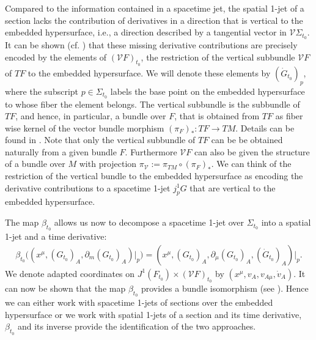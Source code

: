 Compared to the information contained in a spacetime jet, the spatial 1-jet of a section lacks the contribution of derivatives in a direction that is vertical to the embedded hypersurface, i.e., a direction described by a tangential vector in $\mathcal{V}\Sigma_{t_0}$. It can be shown (cf. \cite{1998physics...1019G}) that these missing derivative contributions are precisely encoded by the elements of
$(\mathcal{V}F)_{t_0}$, the restriction of the vertical subbundle $\mathcal{V}F$ of $TF$ to the embedded hypersurface. We will denote these elements by $(\dot{G}_{t_0})_p$, where the subscript $p\in \Sigma_{t_0}$ labels the base point on the embedded hypersurface to whose fiber the element belongs. The vertical subbundle is the subbundle of $TF$, and hence, in particular, a bundle over $F$, that is obtained from $TF$ as fiber wise kernel of the vector bundle morphism $(\pi_F)_{\ast} : TF \rightarrow
TM$. Details can be found in \cite{1998physics...1019G}. 
Note that only the vertical subbundle of $TF$ can be be obtained naturally from a given bundle $F$. Furthermore $\mathcal{V}F$ can also be given the structure of a bundle over $M$ with projection $\pi_{\mathcal{V}}:=\pi_{TM} \circ (\pi_F)_{\ast}$. We can think of the restriction of the vertical bundle to the embedded hypersurface as encoding the derivative contributions to a spacetime 1-jet $j^1_pG$ that are vertical to the embedded hypersurface.

The map $\beta_{t_0}$ allows us now to decompose a spacetime 1-jet over $\Sigma_{t_0}$ into a spatial 1-jet and a time derivative:
\begin{align}
    \beta_{t_0}\bigl ( (x^{\mu},(G_{t_0})_A, \partial_m(G_{t_0})_A) \big \vert_p \bigr ) = (x^{\mu},(G_{t_0})_A, \partial_{\mu}(G_{t_0})_A, (\dot{G}_{t_0})_A) \vert _p.
\end{align}
We denote adapted coordinates on $J^1(F_{t_0}) \times (\mathcal{V}F)_{t_0}$ by $(x^{\mu}, v_A, v_{A{\mu}}, \dot{v}_A)$. It can now be shown that the map $\beta_{t_0}$ provides a bundle isomorphism (see \cite{2004math.ph..11032G}). Hence we can either work with spacetime 1-jets of sections over the embedded hypersurface or we work with spatial 1-jets of a section and its time derivative, $\beta_{t_0}$ and its inverse provide the identification of the two approaches.

